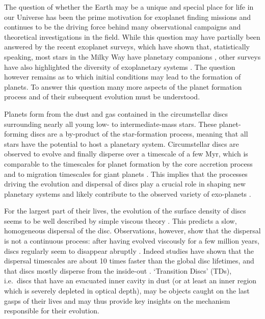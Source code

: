 \documentclass[10pt,fleqn,twoside]{article}
\begin{document}
The question of whether the Earth may be a unique and special place for life
in our Universe has been the prime motivation for exoplanet finding missions
and continues to be the driving force behind many observational campaigns and
theoretical investigations in the field. While this question may have
partially been answered by the recent exoplanet surveys, which have shown
 that, statistically speaking, most stars in the Milky Way have planetary
  companions \citep{2012Natur.481..167C}, other surveys have
also highlighted the diversity of exoplanetary systems \citep{2015ApJS..217...31M}. 
The question however remains as to which
initial conditions may lead to the formation of planets. To answer
this question many more aspects of the planet formation process and of their
subsequent evolution must be understood.

Planets form from the dust and gas contained in the circumstellar discs surrounding nearly all young low- to intermediate-mass stars. These planet-forming discs are a by-product of the star-formation process, meaning that all stars have the potential to host a planetary system.
Circumstellar discs are observed to evolve and finally disperse over a
timescale of a few Myr, which is comparable to
the timescales for planet formation by the core accretion process
 and to migration timescales for giant planets
\citep[see][for a review]{2011ARA&A..49..195A}. This implies that the processes driving the
evolution and dispersal of discs play a crucial role in shaping new
planetary systems and likely contribute to the observed variety of exo-planets
\citep[see e.g.,]{2012MNRAS.422L..82A, 2015MNRAS.450.3008E}.

For the largest part
of their lives, the evolution of the surface density of discs seems to be well
described by simple viscous theory 
\citep[e.g.][]{1998ApJ...495..385H, 1974MNRAS.168..603L}.
This predicts a slow, homogeneous dispersal of the
disc. Observations, however, show that the dispersal is not a
continuous process: after having evolved viscously for a few million
years, discs regularly seem to disappear abruptly 
\citep[e.g.,][]{1995ApJS..101..117K, 2010ApJS..186..111L}.
Indeed studies have shown that the dispersal
timescales are about 10 times faster than the global disc lifetimes, and
that discs mostly disperse from the inside-out 
\citep[e.g.,][]{2011MNRAS.410..671E, 2013MNRAS.428.3327K}. 
`Transition Discs' (TDs), i.e.\ discs
that have an evacuated inner cavity in dust (or at least an inner region
which is severely depleted in optical depth), may be objects caught on
the last gasps of their lives and may thus provide key insights on the
mechanism responsible for their evolution. 
\end{document}
